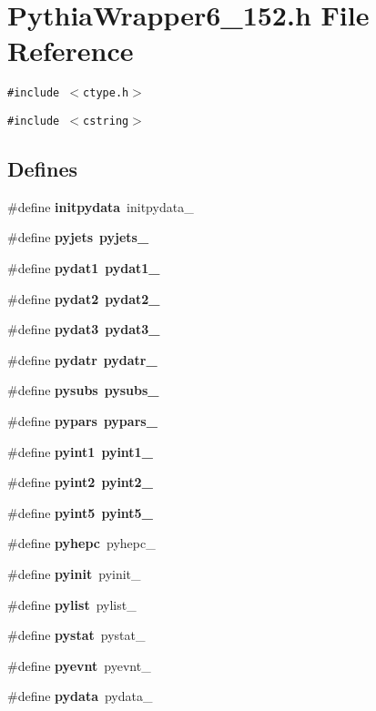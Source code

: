 \section{Pythia\-Wrapper6\_\-152.h File Reference}
\label{PythiaWrapper6__152_8h}
{\tt \#include $<$ctype.h$>$}\par
{\tt \#include $<$cstring$>$}\par
\subsection*{Defines}
\begin{CompactItemize}
\item 
\#define {\bf initpydata}~initpydata\_\-
\item 
\#define {\bf pyjets}~{\bf pyjets\_\-}
\item 
\#define {\bf pydat1}~{\bf pydat1\_\-}
\item 
\#define {\bf pydat2}~{\bf pydat2\_\-}
\item 
\#define {\bf pydat3}~{\bf pydat3\_\-}
\item 
\#define {\bf pydatr}~{\bf pydatr\_\-}
\item 
\#define {\bf pysubs}~{\bf pysubs\_\-}
\item 
\#define {\bf pypars}~{\bf pypars\_\-}
\item 
\#define {\bf pyint1}~{\bf pyint1\_\-}
\item 
\#define {\bf pyint2}~{\bf pyint2\_\-}
\item 
\#define {\bf pyint5}~{\bf pyint5\_\-}
\item 
\#define {\bf pyhepc}~pyhepc\_\-
\item 
\#define {\bf pyinit}~pyinit\_\-
\item 
\#define {\bf pylist}~pylist\_\-
\item 
\#define {\bf pystat}~pystat\_\-
\item 
\#define {\bf pyevnt}~pyevnt\_\-
\item 
\#define {\bf pydata}~pydata\_\-
\end{CompactItemize}
